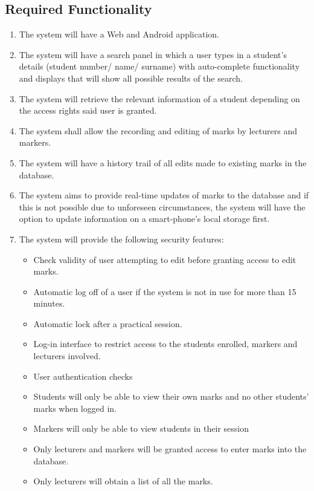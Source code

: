 \documentclass[a4paper]{article}
\begin{document}
		\subsection{Required Functionality}
		\begin{enumerate}
		\item The system will have a Web and Android application.
		\item The system will have a search panel in which a user types in a student's details (student number/ name/ surname) with auto-complete functionality and displays that will show all possible results of the search.
		\item The system will retrieve the relevant information of a student depending on the access rights said user is granted.
		\item The system shall allow the recording and editing of marks by lecturers and markers.
		\item The system will have a history trail of all edits made to existing marks in the database.
		\item The system aims to provide real-time updates of marks to the database and if this is not possible due to unforeseen circumstances, the system will have the option to update information on a smart-phone's local storage first.
		\item The system will provide the following security features:
		\begin{itemize}
			\item{Check validity of user attempting to edit before granting access to edit marks.}
			\item{Automatic log off of a user if the system is not in use for more than 15 minutes.}
			\item{Automatic lock after a practical session.}
			\item{Log-in interface to restrict access to the students enrolled, markers and lecturers involved.}
			\item{User authentication checks}
			\item{Students will only be able to view their own marks and no other students' marks when logged in.}
			\item{Markers will only be able to view students in their session}
			\item{Only lecturers and markers will be granted access to enter marks into the database.}
			\item{Only lecturers will obtain a list of all the marks.}
		
		\end{itemize}
		

\end{enumerate}
\end{document}

